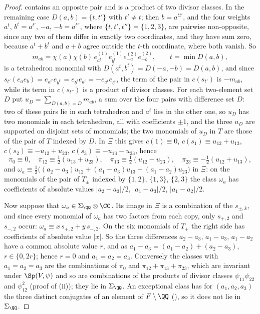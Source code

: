 \begin{proof}
contains an opposite pair and is a product of two divisor classes. In the
remaining case $D(a,b)=\{t,t'\}$ with $t'\ne t$; then $b=a^{tt'}$, and the
four weights $a^{t}$, $b^{t}=a^{t'}$, $-a$, $-b=a^{t''}$, where
$\{t,t',t''\}=\{1,2,3\}$, are pairwise non-opposite, since any two of them
differ in exactly two coordinates, and they have sum zero, because
$a^{t}+b^{t}$ and $a+b$ agree outside the $t$-th coordinate, where both
vanish. So
\[
  m_{ab}=\chi(a)\chi(b)\,e^{(1)}_{a^{t}}e^{(1)}_{b^{t}}e^{(2)}_{-a}e^{(2)}_{-b},
  \qquad t=\min D(a,b),
\]
is a tetrahedron monomial with $D(a^{t},b^{t})=D(-a,-b)=D(a,b)$, and since
$s_{t'}(e_{a}e_{b})=e_{a^{t'}}e_{b^{t'}}=e_{b^{t}}e_{a^{t}}=-e_{a^{t}}e_{b^{t}}$,
the term of the pair in $c(s_{t'})$ is $-m_{ab}$, while its term in
$c(s_{t''})$ is a product of divisor classes. For each two-element set $D$
put $u_{D}=\sum_{D(a,b)=D}m_{ab}$, a sum over the four pairs with difference
set $D$: two of these pairs lie in each tetrahedron and $a^{t}$ lies in the
other one, so $u_{D}$ has two monomials in each tetrahedron, all with
coefficients $\pm1$, and the three $u_{D}$ are supported on disjoint sets of
monomials; the two monomials of $u_{D}$ in $T$ are those of the pair of
$T$ indexed by $D$. In $\Xi$ this gives $c(1)\equiv0$,
$c(s_{1})\equiv u_{12}+u_{13}$, $c(s_{2})\equiv-u_{12}+u_{23}$,
$c(s_{3})\equiv-u_{13}-u_{23}$, hence
\begin{equation}\label{eq:pimodulo}
  \pi_{0}\equiv0,\quad
  \pi_{12}\equiv\tfrac12(u_{13}+u_{23}),\quad
  \pi_{13}\equiv\tfrac12(u_{12}-u_{23}),\quad
  \pi_{23}\equiv-\tfrac12(u_{12}+u_{13}),
\end{equation}
and $\omega_{a}\equiv\frac12\bigl((a_{2}-a_{3})u_{12}+(a_{1}-a_{3})u_{13}
+(a_{1}-a_{2})u_{23}\bigr)$ in $\Xi$: on the monomials of the pair of
$T_{\pm}$ indexed by $\{1,2\}$, $\{1,3\}$, $\{2,3\}$ the class $\omega_{a}$
has coefficients of absolute values $|a_{2}-a_{3}|/2$, $|a_{1}-a_{3}|/2$,
$|a_{1}-a_{2}|/2$.

Now suppose that $\omega_{a}\in\Sigma_{\QQ}\otimes\CC$. Its image in $\Xi$
is a combination of the $s_{\pm,k}$, and since every monomial of
$\omega_{a}$ has two factors from each copy, only $s_{+,2}$ and $s_{-,2}$
occur: $\omega_{a}\equiv x\,s_{+,2}+y\,s_{-,2}$. On the six monomials of
$T_{+}$ the right side has coefficients of absolute value $|x|$. So the
three differences $a_{2}-a_{3}$, $a_{1}-a_{3}$, $a_{1}-a_{2}$ have a common
absolute value $r$, and as $a_{1}-a_{3}=(a_{1}-a_{2})+(a_{2}-a_{3})$,
$r\in\{0,2r\}$; hence $r=0$ and $a_{1}=a_{2}=a_{3}$. Conversely the classes
with $a_{1}=a_{2}=a_{3}$ are the combinations of $\pi_{0}$ and
$\pi_{12}+\pi_{13}+\pi_{23}$, which are invariant under $\Sp(V,\psi)$ and so
are combinations of the products of divisor classes $\psi_{11}\psi_{22}$ and
$\psi_{12}^{2}$ (proof of (ii)); they lie in
$\Sigma_{\QQ}$. An exceptional class
has for $(a_{1},a_{2},a_{3})$ the three distinct conjugates of an element of
$F\setminus\QQ$ (), so it does not lie in
$\Sigma_{\QQ}$.


\end{proof}
